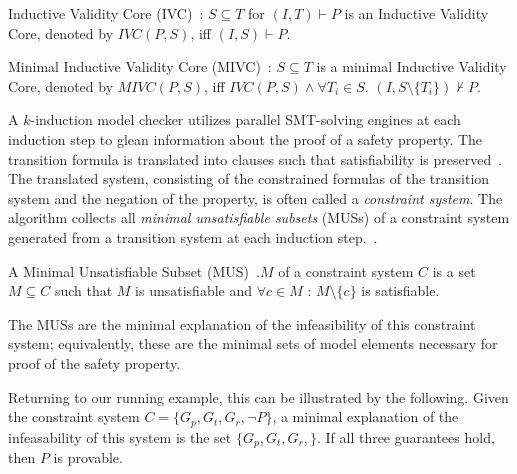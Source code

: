 \begin{definition}
Inductive Validity Core (IVC)~\cite{GhassabaniGW16}: $S \subseteq T$ for $(I, T) \vdash P$ is an Inductive Validity Core, denoted by $IVC(P,S)$, iff $(I,S) \vdash P$.
\end{definition}

\begin{definition}
Minimal Inductive Validity Core (MIVC)~\cite{Ghassabani2017EfficientGO}: $S \subseteq T$ is a minimal Inductive Validity Core, denoted by $MIVC(P,S)$, iff $IVC(P,S) \land \forall T_i \in S$. $(I, S \setminus \{T_i\}) \not \vdash P$.
\end{definition}

A $\mathit{k}$-induction model checker utilizes parallel SMT-solving engines at each induction step to glean information about the proof of a safety property. The transition formula is translated into clauses such that satisfiability is preserved~\cite{een2003temporal}. The translated system, consisting of the constrained formulas of the transition system and the negation of the property, is often called a \emph{constraint system}. The \aivcalg algorithm collects all {\em minimal unsatisfiable subsets} (MUSs) of a constraint system generated from a transition system at each induction step.~\cite{Ghassabani2017EfficientGO,bendik2018online}. 

\begin{definition}
A Minimal Unsatisfiable Subset (MUS)~\cite{reiter1987theory}.$M$ of a constraint system $C$ is a set $M \subseteq C$ such that $M$ is unsatisfiable and $\forall c \in M$ : $M \setminus \{c\}$ is satisfiable.
\end{definition}
The MUSs are the minimal explanation of the infeasibility of this constraint system; equivalently, these are the minimal sets of model elements necessary for proof of the safety property.

Returning to our running example, this can be illustrated by the following. Given the constraint system $C = \{G_p, G_t, G_r, \neg P\}$, a minimal explanation of the infeasability of this system is the set $\{G_p, G_t, G_r,\}$. If all three guarantees hold, then $P$ is provable. 

